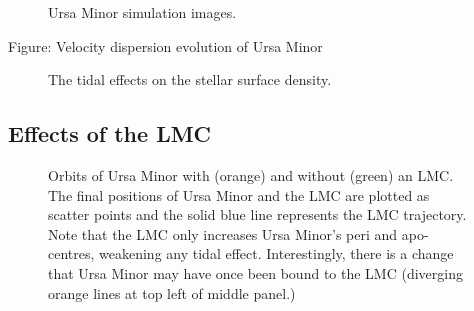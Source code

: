 \begin{figure}
\centering
{}
\caption[Ursa Minor simulation snapshots]{Ursa Minor simulation images.}
\end{figure}

Figure: Velocity dispersion evolution of Ursa Minor

\begin{figure}
\centering
{}
\caption[Ursa Minor simulated density profiles]{The tidal effects on the
stellar surface density.}
\end{figure}

\subsection{Effects of the LMC}\label{effects-of-the-lmc}

\begin{figure}
\centering
{}
\caption[Ursa Minor orbits with LMC]{Orbits of Ursa Minor with (orange)
and without (green) an LMC. The final positions of Ursa Minor and the
LMC are plotted as scatter points and the solid blue line represents the
LMC trajectory. Note that the LMC only increases Ursa Minor's peri and
apo-centres, weakening any tidal effect. Interestingly, there is a
change that Ursa Minor may have once been bound to the LMC (diverging
orange lines at top left of middle panel.)}
\end{figure}
